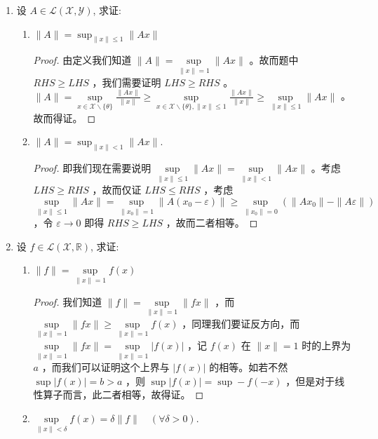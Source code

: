 \begin{enumerate}[leftmargin=2cm, label=\arabic*]
\begin{proof}
			再说明必要性，若 $T\in\mathscr{L}(\mathscr{X},\ \mathscr{Y})$ ，则存在常数 $M\geqslant 0$ ，使得上式成立，故而对于 $\mathscr{X}$ 中任意有界集 $D$ ，$\|x\|_{\mathscr{X}} < \infty$ ，从而映射后的集合 $\|Tx\|_{\mathscr{Y}} < \infty$ ，故而映射为有界集。 
		\end{proof}
		\item 设 $A \in \mathscr{L}(\mathscr{X}, \mathscr{Y})$, 求证:
		\begin{enumerate}[leftmargin=1cm, label=(\arabic*)]
			\item $\|A\|=\sup _{\|x\| \leqslant 1}\|A x\|$
			\begin{proof}
				由定义我们知道 $\|A\| = \sup\limits_{\|x\| = 1} \|Ax\|$ 。故而题中 $RHS \geqslant LHS$ ，我们需要证明 $LHS\geqslant RHS$ 。$\|A\| = \sup\limits_{x\in\mathscr{X}\backslash\{\theta\}} \frac{\|Ax\|}{\|x\|} \geqslant \sup\limits_{x\in\mathscr{X}\backslash\{\theta\}, \|x\|\leqslant 1} \frac{\|Ax\|}{\|x\|} \geqslant \sup\limits_{\|x\|\leqslant 1} \|Ax\|$ 。故而得证。  
			\end{proof}
			\item $\|A\|=\sup _{\|x\|<1}\|A x\|$.
			\begin{proof}
				即我们现在需要说明 $\sup\limits_{\|x\| \leqslant 1} \|Ax\| = \sup\limits_{\|x\|<1} \|Ax\|$ 。考虑 $LHS \geqslant RHS$ ，故而仅证 $LHS \leqslant RHS$ ，考虑 $\sup\limits_{\|x\|\leqslant 1} \|Ax\| = \sup\limits_{\|x_0\| = 1} \|A(x_0 - \varepsilon)\| \geqslant \sup\limits_{\|x_0\| = 0} (\|Ax_0\| - \|A\varepsilon\|)$ ，令 $\varepsilon\to 0$ 即得 $RHS\geqslant LHS$ ，故而二者相等。 
			\end{proof}
		\end{enumerate}
		\item 设 $f \in \mathscr{L}(\mathscr{X}, \mathbb{R})$, 求证:
		\begin{enumerate}[leftmargin=1cm, label=(\arabic*)]
			\item $\|f\|=\sup\limits_{\|x\|=1} f(x)$
			\begin{proof}
				我们知道 $\|f\| = \sup\limits_{\|x\| = 1} \|fx\|$ ，而 $\sup\limits_{\|x\| = 1} \|fx\| \geqslant \sup\limits_{\|x\| = 1} f(x)$ ，同理我们要证反方向，而 $\sup\limits_{\|x\| = 1} \|fx\| = \sup\limits_{\|x\| = 1} |f(x)|$ ，记 $f(x)$ 在 $\|x\| = 1$ 时的上界为 $a$ ，而我们可以证明这个上界与 $|f(x)|$ 的相等。如若不然 $\sup |f(x)| = b > a$ ，则 $\sup |f(x)| = \sup - f(-x)$ ，但是对于线性算子而言，此二者相等，故得证。
			\end{proof}
			\item $\sup\limits_{\|x\|<\delta} f(x)=\delta\|f\| \quad(\forall \delta>0)$.

\end{enumerate}
\end{enumerate}
